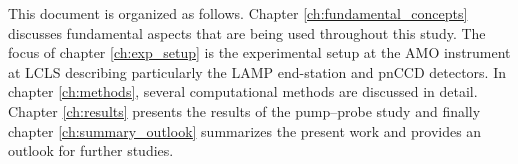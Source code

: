 %
This document is organized as follows. Chapter \ref{ch:fundamental_concepts} discusses fundamental aspects that are being used throughout this study. The focus of chapter \ref{ch:exp_setup} is the experimental setup at the AMO instrument at LCLS describing particularly the LAMP end-station and pnCCD detectors. In chapter \ref{ch:methods}, several computational methods are discussed in detail. Chapter \ref{ch:results} presents the results of the pump--probe study and finally chapter \ref{ch:summary_outlook} summarizes the present work and provides an outlook for further studies.
%
%
%